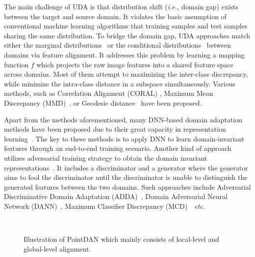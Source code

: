 \documentclass{article}
\begin{document}
The main challenge of UDA is that distribution shift (\textit{i.e.,} domain gap) exists between the target and source domain. It violates the basic assumption of conventional machine learning algorithms that training samples and test samples sharing the same distribution. To bridge the domain gap, UDA approaches match either the marginal distributions~\cite{sugiyama2008direct,pan2010domain,gong2013connecting,Seg_Lichen_TIP18} or the conditional distributions~\cite{zhang2013domain,courty2017joint} between domains via feature alignment. It addresses this problem by learning a mapping function $f$ which projects the raw image features into a shared feature space across domains. Most of them attempt to maximizing the inter-class discrepancy, while minimize the intra-class distance in a subspace simultaneously. Various methods, such as Correlation Alignment (CORAL) \cite{sun2016deep}, Maximum Mean Discrepancy (MMD)~\cite{borgwardt2006integrating,long2013transfer}, or Geodesic distance~\cite{gopalan2011domain} have been proposed. 



Apart from the methods aforementioned, many DNN-based domain adaptation methods have been proposed due to their great capacity in representation learning~\cite{he2016deep,simonyan2014very,krizhevsky2012imagenet}. The key to these methods is to apply DNN to learn domain-invariant features through an end-to-end training scenario. Another kind of approach utilizes adversarial training strategy to obtain the domain invariant representations~\cite{ganin2014unsupervised,tzeng2017adversarial,Dong_2019_ICCV, Qin_2019_ICCV_Workshops}. It includes a discriminator and a generator where the generator aims to fool the discriminator until the discriminator is unable to distinguish the generated features between the two domains. Such approaches include Adversarial Discriminative Domain Adaptation (ADDA)~\cite{tzeng2017adversarial}, Domain Adversarial Neural Network (DANN)~\cite{ganin2014unsupervised}, Maximum Classifier Discrepancy (MCD)~\cite{saito2018maximum}~\textit{etc.} 

\label{method}
\begin{figure*}[t]
\centering
{}\\

\caption{Illustration of PointDAN which mainly consists of local-level and global-level alignment. }\label{f2}

\end{figure*}
\end{document}
